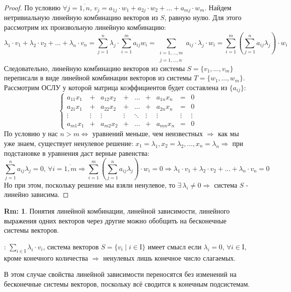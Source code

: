 \documentclass[12pt]{article}
\newcommand{\MI}{\mathrm{I}}
\theoremstyle{definition}
\newtheorem{rem}{Rm:}
\newcommand{\ddsum}[2]{\displaystyle\sum\limits_{#1}^{#2}}
\begin{document}
\begin{proof}
	По условию $\forall j = \overline{1,n}, \, v_j = a_{1j}{\cdot}w_1 + a_{2j}{\cdot}w_2 + \dotsc + a_{mj}{\cdot}w_m$. Найдем нетривиальную линейную комбинацию векторов из $S$, равную нулю. Для этого рассмотрим их произвольную линейную комбинацию:
	$$
		\lambda_1{\cdot} v_1 + \lambda_2{\cdot} v_2 + \dotsc+ \lambda_n{\cdot} v_n = \ddsum{j = 1}{n}\lambda_j{\cdot}\ddsum{i = 1}{m}a_{ij}w_i = \ddsum{\substack{i = 1,\dotsc,m\\j = 1,\dotsc, n}}{}a_{ij}{\cdot}\lambda_j{\cdot}w_i = \ddsum{i = 1}{m}\left(\ddsum{j = 1}{n}a_{ij}\lambda_j\right){\cdot}w_i
	$$
	Следовательно, линейную комбинацию векторов из системы $S = \{v_1,\dotsc, v_m\}$ переписали в виде линейной комбинации векторов из системы $T = \{w_1,\dotsc, w_m\}$. Рассмотрим ОСЛУ у которой матрица коэффициентов будет составлена из $\{a_{ij}\}$:
	$$
		\left\{
			\begin{array}{ccccccccc}
				a_{11}x_1 & + & a_{12}x_2 & + & \dotsc & + & a_{1n}x_n & = & 0 \\
				a_{21}x_1 & + & a_{22}x_2 & + & \dotsc & + & a_{2n}x_n & = & 0 \\
				\vdots & \vdots & \vdots & \vdots & \ddots & \vdots & \vdots & \vdots & \vdots \\ 
				a_{m1}x_1 & + & a_{m2}x_2 & + & \dotsc & + & a_{mn}x_n & = & 0 
			\end{array}
		\right.
	$$
	По условию у нас $n > m \Leftrightarrow$ уравнений меньше, чем неизвестных $\Rightarrow$ как мы уже знаем, существует ненулевое решение: $x_1 = \lambda_1 , x_2 = \lambda_2, \dotsc, x_n = \lambda_n \Rightarrow$ при подстановке в уравнения даст верные равенства:
	$$
		\ddsum{j = 1}{n}a_{ij}\lambda_j = 0, \, \forall i = \overline{1,m} \Rightarrow \ddsum{i = 1}{m}\left(\ddsum{j = 1}{n}a_{ij}\lambda_j\right){\cdot}w_i = 0 \Rightarrow 	\lambda_1{\cdot} v_1 + \lambda_2{\cdot} v_2 + \dotsc+ \lambda_n{\cdot} v_n = 0 
	$$
	Но при этом, поскольку решение мы взяли ненулевое, то $\exists \, \lambda_i \neq 0 \Rightarrow$ система $S$ - линейно зависима.
\end{proof}
\begin{rem}
	Понятия линейной комбинации, линейной зависимости, линейного выражения одних векторов через другие можно обобщить на бесконечные системы векторов.
	
	: $\ddsum{i \in \MI}{}\lambda_i{\cdot}v_i$, система векторов $S = \{v_i \mid i \in \MI\}$ имеет смысл если $\lambda_i = 0, \, \forall i \in \MI$, кроме конечного количества $\Rightarrow$ ненулевых лишь конечное число слагаемых. 
	
	В этом случае свойства линейной зависимости переносятся без изменений на бесконечные системы векторов, поскольку всё сводится к конечным подсистемам.
\end{rem}
\end{document}
